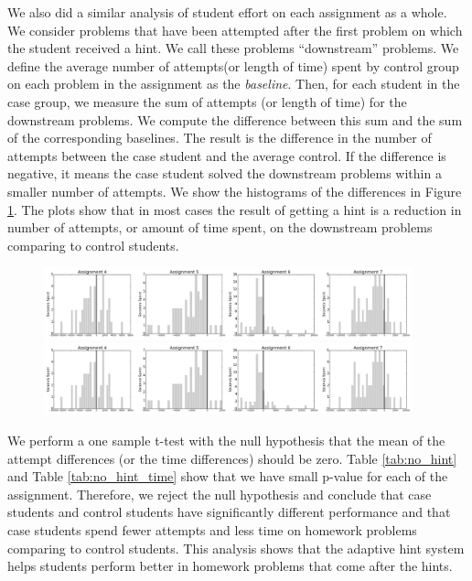 \documentclass{llncs2e/llncs}
\begin{document}
We also did a similar analysis of student effort on each assignment as a whole. We consider problems that have been attempted after the first problem on which the student received a hint. We call these problems ``downstream'' problems. We define the average number of attempts(or length of time) spent by control group on each problem in the assignment as the {\em baseline}. Then, for each student in the case group, we measure the sum of attempts (or length of time) for the downstream problems. We compute the difference between this sum and the sum of the corresponding baselines. The result is the difference in the number of attempts between the case student and the average control. If the difference is negative, it means the case student solved the downstream problems within a smaller number of attempts. We show the histograms of the differences in Figure \ref{fig:downstream_analysis}. The plots show that in most cases the result of getting a hint is a reduction in number of attempts, or amount of time spent, on the downstream problems comparing to control
students.

\begin{figure}[th]
\centering
	\includegraphics[width=0.95\textwidth]{image/assignment_time_downstream.png}\\
	\includegraphics[width=0.95\textwidth]{image/assignment_time_downstream.png}
\label{fig:downstream_analysis}

\end{figure}

We perform a one sample t-test with the null hypothesis that the mean of the attempt differences (or the time differences) should be zero. Table \ref{tab:no_hint} and Table \ref{tab:no_hint_time} show that we have small p-value for each of the assignment. Therefore, we reject the null hypothesis and conclude that case students and control students have significantly different performance and that case students spend fewer attempts and less time on homework problems comparing to control students. This analysis shows that the adaptive hint system helps students perform better in homework problems that come after the hints.
\end{document}
